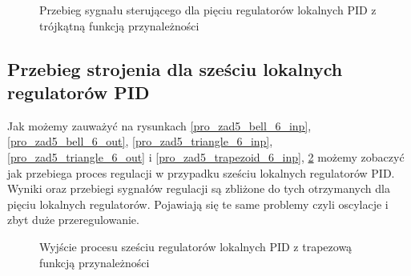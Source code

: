 \begin{figure}[b]
    \centering
    \caption{Przebieg sygnału sterującego dla pięciu regulatorów lokalnych PID z trójkątną  funkcją przynależności}
    \label{pro_zad5_triangle_5_inp}
\end{figure}
\FloatBarrier

\subsection{Przebieg strojenia dla sześciu lokalnych regulatorów PID}
Jak możemy zauważyć na rysunkach \ref{pro_zad5_bell_6_inp}, \ref{pro_zad5_bell_6_out}, \ref{pro_zad5_triangle_6_inp}, \ref{pro_zad5_triangle_6_out} i \ref{pro_zad5_trapezoid_6_inp}, \ref{pro_zad5_trapezoid_6_out} możemy zobaczyć jak przebiega proces regulacji w przypadku sześciu lokalnych regulatorów PID. Wyniki oraz przebiegi sygnałów regulacji są zbliżone do tych otrzymanych dla pięciu lokalnych regulatorów. Pojawiają się te same problemy czyli oscylacje i zbyt duże przeregulowanie. 
\begin{figure}[b]
    \centering
    \caption{Wyjście procesu sześciu regulatorów lokalnych PID z trapezową funkcją przynależności}
    \label{pro_zad5_trapezoid_6_out}
\end{figure}

